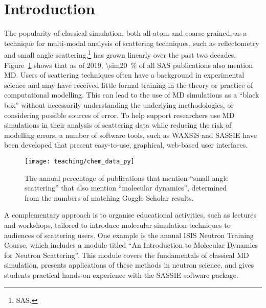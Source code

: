 \section{Introduction}
The popularity of classical simulation, both all-atom and coarse-grained, as a technique for multi-modal analysis of scattering techniques, such as reflectometry and small angle scattering,\footnote{SAS.} has grown linearly over the past two decades.\autocite{pan_molecular_2012,boldon_review_2015,hub_interpreting_2018,koutsioubas_combined_2016,darre_molecular_2015,scoppola_combining_2018}
Figure~\ref{fig:growth} shows that as of 2019, \SI{\sim20}{\percent} of all SAS publications also mention MD.
Users of scattering techniques often have a background in experimental science and may have received little formal training in the theory or practice of computational modelling.
This can lead to the use of MD simulations as a ``black box'' without necessarily understanding the underlying methodologies, or considering possible sources of error.
To help support researchers use MD simulations in their analysis of scattering data while reducing the risk of modelling errors, a number of software tools, such as WAXSiS\autocite{chen_validating_2014,knight_waxsis_2015} and SASSIE\autocite{perkins_atomistic_2016} have been developed that present easy-to-use, graphical, web-based user interfaces.
%
\begin{figure}[t]
    \centering
    \texttt{[image: teaching/chem\_data\_py]}
    \caption{The annual percentage of publications that mention ``small angle scattering'' that also mention ``molecular dynamics'', determined from the numbers of matching Goggle Scholar results.}
    \label{fig:growth}
\end{figure}
%

A complementary approach is to organise educational activities, such as lectures and workshops, tailored to introduce molecular simulation techniques to audiences of scattering users.
One example is the annual ISIS Neutron Training Course, which includes a module titled ``An Introduction to Molecular Dynamics for Neutron Scattering''.
This module covers the fundamentals of classical MD simulation, presents applications of these methods in neutron science, and gives students practical hands-on experience with the SASSIE software package.\autocite{perkins_atomistic_2016}

